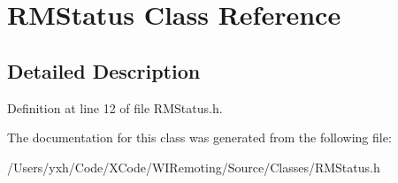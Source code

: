 \hypertarget{interface_r_m_status}{
\section{RMStatus Class Reference}
\label{interface_r_m_status}
}


\subsection{Detailed Description}


Definition at line 12 of file RMStatus.h.

The documentation for this class was generated from the following file:\begin{DoxyCompactItemize}
\item 
/Users/yxh/Code/XCode/WIRemoting/Source/Classes/RMStatus.h\end{DoxyCompactItemize}
